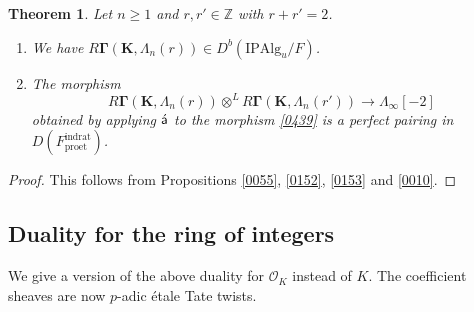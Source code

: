 \documentclass{amsart}
\newtheorem{Thm}{Theorem}[subsection]
\theoremstyle{remark}
\numberwithin{equation}{subsection}
\newcommand{\Order}{\mathcal{O}}
\newcommand{\tensor}{\mathbin{\otimes}}
\newcommand{\Z}{\mathbb{Z}}
\newcommand{\et}{\mathrm{et}}
\newcommand{\rat}{\mathrm{rat}}
\newcommand{\ind}{\mathrm{ind}}
\newcommand{\pro}{\mathrm{pro}}
\newcommand{\Alg}{\mathrm{Alg}}
\newcommand{\Ind}{\mathrm{I}}
\newcommand{\Pro}{\mathrm{P}}
\newcommand{\alg}[1]{\mathbf{#1}}
\newcommand{\algebrize}{\Acute{\mathsf{a}}}
\begin{document}
\begin{Thm}
	Let $n \ge 1$ and $r, r' \in \Z$ with $r + r' = 2$.
	\begin{enumerate}
		\item
			We have
			$R \alg{\Gamma}(\alg{K}, \Lambda_{n}(r)) \in D^{b}(\Ind \Pro \Alg_{u} / F)$.
		\item
			The morphism
				\[
							R \alg{\Gamma}(\alg{K}, \Lambda_{n}(r))
						\tensor^{L}
							R \alg{\Gamma}(\alg{K}, \Lambda_{n}(r'))
					\to
						\Lambda_{\infty}[-2]
				\]
			obtained by applying $\algebrize$ to the morphism \eqref{0439}
			is a perfect pairing in $D(F^{\ind\rat}_{\pro\et})$.
	\end{enumerate}
\end{Thm}

\begin{proof}
	This follows from Propositions \ref{0055}, \ref{0152}, \ref{0153} and \ref{0010}.
\end{proof}


\subsection{Duality for the ring of integers}
\label{0056}

We give a version of the above duality for $\Order_{K}$ instead of $K$.
The coefficient sheaves are now $p$-adic \'etale Tate twists.
\end{document}

